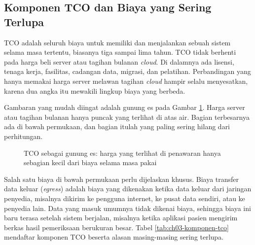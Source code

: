 \subsection{Komponen TCO dan Biaya yang Sering Terlupa}

TCO adalah seluruh biaya untuk memiliki dan menjalankan sebuah sistem selama masa tertentu, biasanya
tiga sampai lima tahun. TCO tidak berhenti pada harga beli server atau tagihan bulanan
\textit{cloud}. Di dalamnya ada lisensi, tenaga kerja, fasilitas, cadangan data, migrasi, dan
pelatihan. Perbandingan yang hanya memakai harga server melawan tagihan \textit{cloud} hampir selalu
menyesatkan, karena dua angka itu mewakili lingkup biaya yang berbeda.

Gambaran yang mudah diingat adalah gunung es pada Gambar \ref{fig:ch03-gunung-es}. Harga server atau
tagihan bulanan hanya puncak yang terlihat di atas air. Bagian terbesarnya ada di bawah permukaan,
dan bagian itulah yang paling sering hilang dari perhitungan.

\begin{figure}[!htb]
  \centering
  
  \caption{TCO sebagai gunung es: harga yang terlihat di penawaran hanya
           sebagian kecil dari biaya selama masa pakai}
  \label{fig:ch03-gunung-es}
\end{figure}

Salah satu biaya di bawah permukaan perlu dijelaskan khusus. Biaya transfer data keluar
(\textit{egress}) adalah biaya yang dikenakan ketika data keluar dari jaringan penyedia, misalnya
dikirim ke pengguna internet, ke pusat data sendiri, atau ke penyedia lain. Data yang masuk umumnya
tidak dikenai biaya, sehingga biaya ini baru terasa setelah sistem berjalan, misalnya ketika
aplikasi pasien mengirim berkas hasil pemeriksaan berukuran besar. Tabel \ref{tab:ch03-komponen-tco}
mendaftar komponen TCO beserta alasan masing-masing sering terlupa.

